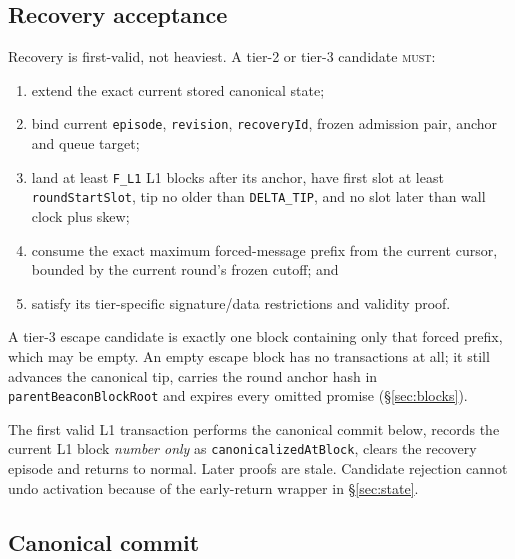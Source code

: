 \documentclass[a4paper,11pt]{article}
\newcommand{\code}[1]{\nolinkurl{#1}}
\newcommand{\must}{\textsc{must}}
\begin{document}
\subsection{Recovery acceptance}

Recovery is first-valid, not heaviest.  A tier-2 or tier-3 candidate \must:

\begin{enumerate}
\item extend the exact current stored canonical state;
\item bind current \code{episode}, \code{revision}, \code{recoveryId}, frozen
admission pair, anchor and queue target;
\item land at least \code{F_L1} L1 blocks after its anchor, have first slot
at least \code{roundStartSlot}, tip no older than
\code{DELTA_TIP}, and no slot later than wall clock plus skew;
\item consume the exact maximum forced-message prefix from the current cursor,
bounded by the current round's frozen cutoff; and
\item satisfy its tier-specific signature/data restrictions and validity proof.
\end{enumerate}

A tier-3 escape candidate is exactly one block containing only that forced
prefix, which may be empty.  An empty escape block has no transactions at all;
it still advances the canonical tip, carries the round anchor hash in
\code{parentBeaconBlockRoot} and expires every omitted promise
(\S\ref{sec:blocks}).

The first valid L1 transaction performs the canonical commit below, records the
current L1 block \emph{number only} as \code{canonicalizedAtBlock}, clears the
recovery episode and returns to normal.
Later proofs are stale.  Candidate rejection cannot undo activation because of
the early-return wrapper in \S\ref{sec:state}.

\subsection{Canonical commit}\label{sec:canonical-commit}
\end{document}
